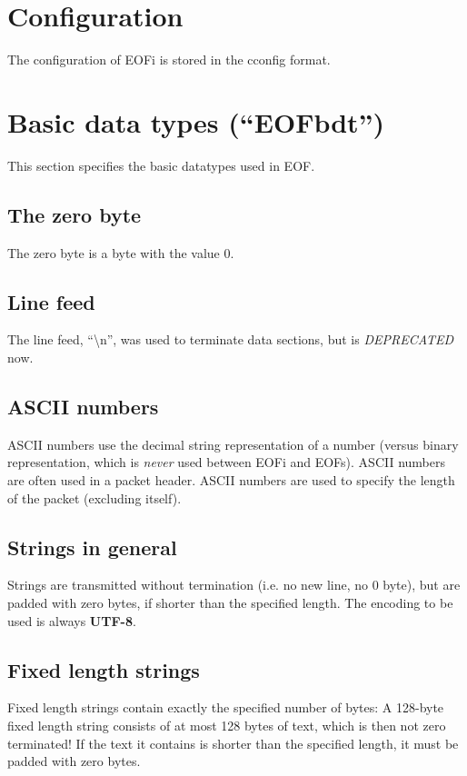 \documentclass[12pt,a4paper]{book}
\begin{document}
\section{Configuration}
The configuration of EOFi is stored in the cconfig\cite{cconfig} format.
\section{Basic data types ("`EOFbdt"')}
This section specifies the basic datatypes used in EOF.
\subsection{The zero byte}
The zero byte is a byte with the value 0.
\subsection{Line feed}
The line feed, "`\textbackslash{}n"', was used to terminate data
sections, but is \emph{DEPRECATED} now.
\subsection{ASCII numbers}
ASCII numbers use the decimal string representation of a number (versus
binary representation, which is \emph{never} used between EOFi and EOFs).
ASCII numbers are often used in a packet header.
ASCII numbers are used to specify the length of the packet (excluding itself).
\subsection{Strings in general}
Strings are transmitted without termination (i.e. no new line, no 0 byte),
but are padded with zero bytes, if shorter than the specified length.
The encoding to be used is always \textbf{UTF-8}\cite{utf8}.
\subsection{Fixed length strings}
Fixed length strings contain exactly the specified number of bytes:
A 128-byte fixed length string consists of at most 128 bytes of text,
which is then not zero terminated!
If the text it contains is shorter than the specified length,
it must be padded with zero bytes.
\end{document}
